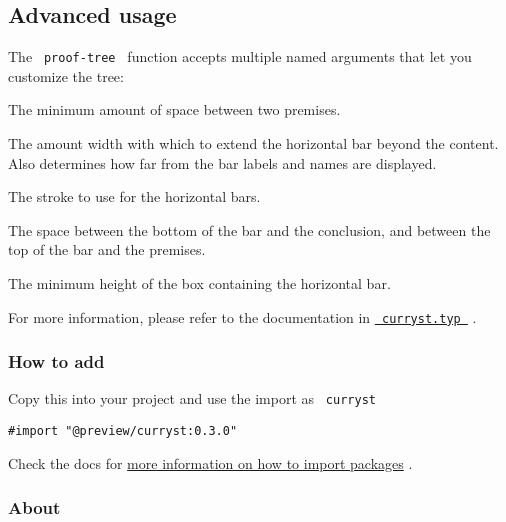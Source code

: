 \subsection{Advanced usage}\label{advanced-usage}

The \texttt{\ proof-tree\ } function accepts multiple named arguments
that let you customize the tree:

\begin{description}
\tightlist
\item[\texttt{\ prem-min-spacing\ }]
The minimum amount of space between two premises.
\item[\texttt{\ title-inset\ }]
The amount width with which to extend the horizontal bar beyond the
content. Also determines how far from the bar labels and names are
displayed.
\item[\texttt{\ stroke\ }]
The stroke to use for the horizontal bars.
\item[\texttt{\ horizontal-spacing\ }]
The space between the bottom of the bar and the conclusion, and between
the top of the bar and the premises.
\item[\texttt{\ min-bar-height\ }]
The minimum height of the box containing the horizontal bar.
\end{description}

For more information, please refer to the documentation in
\href{https://github.com/typst/packages/raw/main/packages/preview/curryst/0.3.0/curryst.typ}{\texttt{\ curryst.typ\ }}
.

\subsubsection{How to add}\label{how-to-add}

Copy this into your project and use the import as \texttt{\ curryst\ }

\begin{verbatim}
#import "@preview/curryst:0.3.0"
\end{verbatim}



Check the docs for
\href{https://typst.app/docs/reference/scripting/\#packages}{more
information on how to import packages} .

\subsubsection{About}\label{about}

